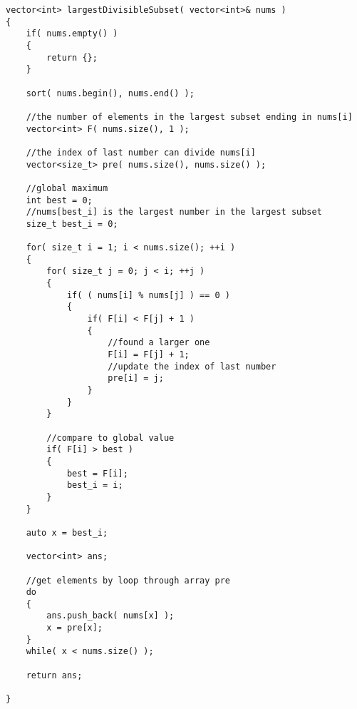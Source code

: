 \setcounter{lstlisting}{0}
\begin{lstlisting}[style=customc, caption={Dynamic Programming}]
vector<int> largestDivisibleSubset( vector<int>& nums )
{
    if( nums.empty() )
    {
        return {};
    }

    sort( nums.begin(), nums.end() );

    //the number of elements in the largest subset ending in nums[i]
    vector<int> F( nums.size(), 1 );

    //the index of last number can divide nums[i]
    vector<size_t> pre( nums.size(), nums.size() );

    //global maximum
    int best = 0;
    //nums[best_i] is the largest number in the largest subset
    size_t best_i = 0;

    for( size_t i = 1; i < nums.size(); ++i )
    {
        for( size_t j = 0; j < i; ++j )
        {
            if( ( nums[i] % nums[j] ) == 0 )
            {
                if( F[i] < F[j] + 1 )
                {
                    //found a larger one
                    F[i] = F[j] + 1;
                    //update the index of last number
                    pre[i] = j;
                }
            }
        }

        //compare to global value
        if( F[i] > best )
        {
            best = F[i];
            best_i = i;
        }
    }

    auto x = best_i;

    vector<int> ans;

    //get elements by loop through array pre
    do
    {
        ans.push_back( nums[x] );
        x = pre[x];
    }
    while( x < nums.size() );

    return ans;

}
\end{lstlisting}
